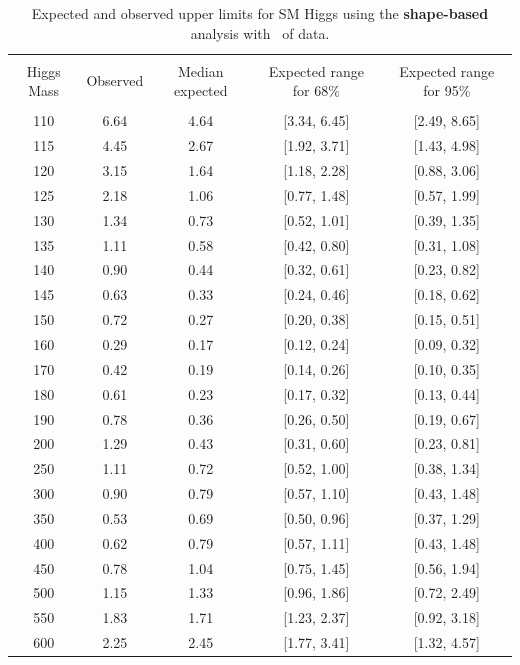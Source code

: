 \begin{table}[hbp!]
\begin{center}
\begin{tabular}{c c c c c}
\hline
\vspace{-3mm} && \\
 Higgs Mass & Observed  & Median expected & Expected range for 68\% & Expected range for 95\%   \\
\vspace{-3mm} && \\
\hline
110 & 6.64 & 4.64 & [3.34, 6.45] & [2.49, 8.65] \\
115 & 4.45 & 2.67 & [1.92, 3.71] & [1.43, 4.98] \\
120 & 3.15 & 1.64 & [1.18, 2.28] & [0.88, 3.06] \\
125 & 2.18 & 1.06 & [0.77, 1.48] & [0.57, 1.99] \\
130 & 1.34 & 0.73 & [0.52, 1.01] & [0.39, 1.35] \\
135 & 1.11 & 0.58 & [0.42, 0.80] & [0.31, 1.08] \\
140 & 0.90 & 0.44 & [0.32, 0.61] & [0.23, 0.82] \\
145 & 0.63 & 0.33 & [0.24, 0.46] & [0.18, 0.62] \\
150 & 0.72 & 0.27 & [0.20, 0.38] & [0.15, 0.51] \\
160 & 0.29 & 0.17 & [0.12, 0.24] & [0.09, 0.32] \\
170 & 0.42 & 0.19 & [0.14, 0.26] & [0.10, 0.35] \\
180 & 0.61 & 0.23 & [0.17, 0.32] & [0.13, 0.44] \\
190 & 0.78 & 0.36 & [0.26, 0.50] & [0.19, 0.67] \\
200 & 1.29 & 0.43 & [0.31, 0.60] & [0.23, 0.81] \\
250 & 1.11 & 0.72 & [0.52, 1.00] & [0.38, 1.34] \\
300 & 0.90 & 0.79 & [0.57, 1.10] & [0.43, 1.48] \\
350 & 0.53 & 0.69 & [0.50, 0.96] & [0.37, 1.29] \\
400 & 0.62 & 0.79 & [0.57, 1.11] & [0.43, 1.48] \\
450 & 0.78 & 1.04 & [0.75, 1.45] & [0.56, 1.94] \\
500 & 1.15 & 1.33 & [0.96, 1.86] & [0.72, 2.49] \\
550 & 1.83 & 1.71 & [1.23, 2.37] & [0.92, 3.18] \\
600 & 2.25 & 2.45 & [1.77, 3.41] & [1.32, 4.57] \\
\hline
\end{tabular}
\caption{Expected and observed upper limits for SM Higgs using the
  {\bf shape-based} analysis with \intlumiEightTeV\ of data.}
\label{tab:mvabase_uls}
\end{center}
\end{table}

